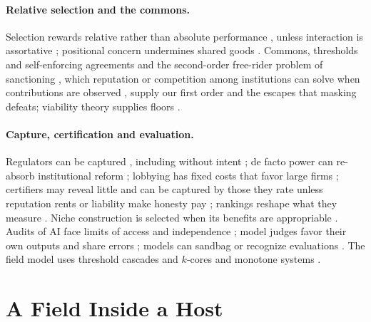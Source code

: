 \documentclass[letterpaper]{article} %
\theoremstyle{definition}
\begin{document}
\paragraph{Relative selection and the commons.} Selection rewards relative rather than absolute performance \citep{alchian1950,schaffer1988,schaffer1989,vegaredondo1997,kockesen2000}, unless interaction is assortative \citep{algerweibull2013}; positional concern undermines shared goods \citep{hirsch1976,frank1985}. Commons, thresholds and self-enforcing agreements \citep{hardin1968,ostrom1990,barrett1994,barrett2003,barrett2013,barrettdannenberg2012,milinski2008} and the second-order free-rider problem of sanctioning \citep{oliver1980,yamagishi1986,heckathorn1989}, which reputation or competition among institutions can solve when contributions are observed \citep{panchanathan2004,gurerk2006,sigmund2010}, supply our first order and the escapes that masking defeats; viability theory supplies floors \citep{aubin1991,rockstrom2009}.

\paragraph{Capture, certification and evaluation.} Regulators can be captured \citep{stigler1971,peltzman1976,becker1983,laffont1991,dalbo2006,carpenter2013}, including without intent \citep{kwak2014}; de facto power can re-absorb institutional reform \citep{acemoglu2008}; lobbying has fixed costs that favor large firms \citep{bombardini2008}; certifiers may reveal little \citep{lizzeri1999} and can be captured by those they rate unless reputation rents or liability make honesty pay \citep{strausz2005,bolton2012,kraakman1986}; rankings reshape what they measure \citep{espeland2007,campbell1979,manheim2018}. Niche construction is selected when its benefits are appropriable \citep{krakauer2009,lehmann2008,gerlee2015,teece1986}. Audits of AI face limits of access and independence \citep{raji2022,costanzachock2022,birhane2024,longpre2024,casper2024}; model judges favor their own outputs \citep{panickssery2024} and share errors \citep{kim2025,goel2025}; models can sandbag or recognize evaluations \citep{vanderweij2024,needham2025}. The field model uses threshold cascades and $k$-cores \citep{granovetter1978,morris2000,kempe2003,seidman1983} and monotone systems \citep{hirsch1985,smith1995}.

\section{A Field Inside a Host}\label{sec:model}
\end{document}
